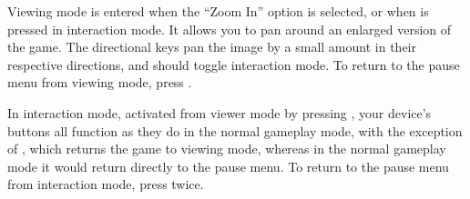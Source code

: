 Viewing mode is entered when the ``Zoom In'' option is selected, or
when {\PluginCancel} is pressed in interaction mode. It allows you to
pan around an enlarged version of the game. The directional keys pan
the image by a small amount in their respective directions, and
{\PluginSelect} should toggle interaction mode. To return to the pause
menu from viewing mode, press {\PluginCancel}.

In interaction mode, activated from viewer mode by pressing
{\PluginSelect}, your device's buttons all function as they do in the
normal gameplay mode, with the exception of {\PluginCancel}, which
returns the game to viewing mode, whereas in the normal gameplay mode
it would return directly to the pause menu. To return to the pause
menu from interaction mode, press {\PluginCancel} twice.

